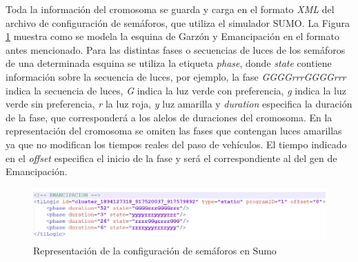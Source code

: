 Toda la información del cromosoma se guarda y carga en el formato \emph{XML} del archivo de configuración de semáforos, que utiliza el simulador SUMO. La Figura \ref{fig:rep_sumo} muestra como se modela la esquina de Garzón y Emancipación en el formato antes mencionado. Para las distintas fases o secuencias de luces de los semáforos de una determinada esquina se utiliza la etiqueta \emph{phase}, donde \emph{state} contiene información sobre la secuencia de luces, por ejemplo, la fase \emph{GGGGrrrGGGGrrr} indica la secuencia de luces, \emph{G} indica la luz verde con preferencia, \emph{g} indica la luz verde sin preferencia, \emph{r} la luz roja, \emph{y} luz amarilla y \emph{duration} especifica la duración de la fase, que corresponderá a los alelos de duraciones del cromosoma. En la representación del cromosoma se omiten las fases que contengan luces amarillas ya que no modifican los tiempos reales del paso de vehículos. El tiempo indicado en el \emph{offset} especifica el inicio de la fase y será el correspondiente al del gen de Emancipación.


\begin{figure}[H]
	\centering
	\includegraphics[width=\linewidth]{Figures/rep_sumo}
	\caption{Representación de la configuración de semáforos en Sumo}
	\label{fig:rep_sumo}
\end{figure}



\newpage

